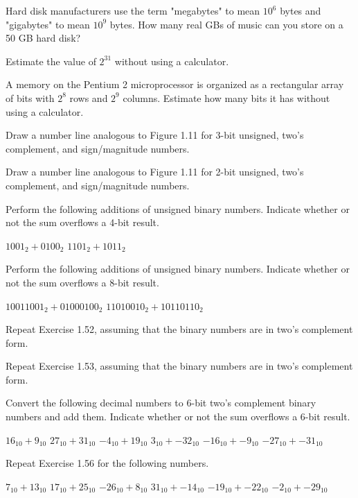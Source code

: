 \exercise %
Hard disk manufacturers use the term "megabytes" to mean $10^6$ bytes and "gigabytes" to mean
$10^9$ bytes. How many real GBs of music can you store on a 50 GB hard disk?

\exercise %
Estimate the value of $2^31$ without using a calculator.

\exercise %
A memory on the Pentium 2 microprocessor is organized as a rectangular array of bits with $2^8$
rows and $2^9$ columns. Estimate how many bits it has without using a calculator.

\exercise %
Draw a number line analogous to Figure 1.11 for 3-bit unsigned, two's complement,
and sign/magnitude numbers.

\exercise %
Draw a number line analogous to Figure 1.11 for 2-bit unsigned, two's complement,
and sign/magnitude numbers.

\exercise %
Perform the following additions of unsigned binary numbers. Indicate whether or not the sum
overflows a 4-bit result.
\begin{tasks}
	\task $1001_2 + 0100_2$
	\task $1101_2 + 1011_2$
\end{tasks}

\exercise %
Perform the following additions of unsigned binary numbers. Indicate whether or not the sum
overflows a 8-bit result.
\begin{tasks}
	\task $10011001_2 + 01000100_2$
	\task $11010010_2 + 10110110_2$
\end{tasks}

\exercise %
Repeat Exercise 1.52, assuming that the binary numbers are in two's complement form.

\exercise %
Repeat Exercise 1.53, assuming that the binary numbers are in two's complement form.

\exercise %
Convert the following decimal numbers to 6-bit two's complement binary numbers and add them.
Indicate whether or not the sum overflows a 6-bit result.
\begin{tasks}
	\task $16_{10} + 9_{10}$
	\task $27_{10} + 31_{10}$
	\task $-4_{10} + 19_{10}$
	\task $3_{10} + -32_{10}$
	\task $-16_{10} + -9_{10}$
	\task $-27_{10} + -31_{10}$
\end{tasks}

\exercise %
Repeat Exercise 1.56 for the following numbers.
\begin{tasks}
	\task $7_{10} + 13_{10}$
	\task $17_{10} + 25_{10}$
	\task $-26_{10} + 8_{10}$
	\task $31_{10} + -14_{10}$
	\task $-19_{10} + -22_{10}$
	\task $-2_{10} + -29_{10}$
\end{tasks}

